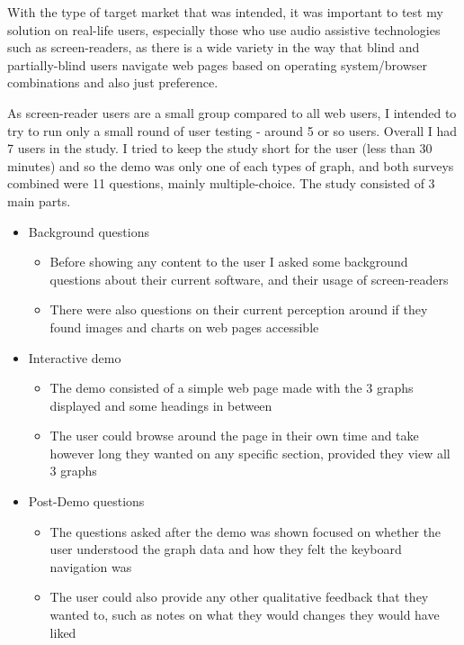 \documentclass[ %
                    author={Aleena Baig},
                supervisor={Dr Simon Lock},
                    degree={BSc},
                     title={On Making Web Accessible Graphs},
                  subtitle={},
                      year={2019} ]{dissertation}
\begin{document}


With the type of target market that was intended, it was important to test my solution on real-life users, especially those who use audio assistive technologies such as screen-readers, as there is a wide variety in the way that blind and partially-blind users navigate web pages based on operating system/browser combinations and also just preference.

As screen-reader users are a small group compared to all web users, I intended to try to run only a small round of user testing - around 5 or so users. Overall I had 7 users in the study. I tried to keep the study short for the user (less than 30 minutes) and so the demo was only one of each types of graph, and both surveys combined were 11 questions, mainly multiple-choice. The study consisted of 3 main parts. 

\begin{itemize}
    \item Background questions
    \begin{itemize}
        \item Before showing any content to the user I asked some background questions about their current software, and their usage of screen-readers
        \item There were also questions on their current perception around if they found images and charts on web pages accessible
    \end{itemize}
    \item Interactive demo
    \begin{itemize}
        \item The demo consisted of a simple web page made with the 3 graphs displayed and some headings in between
        \item The user could browse around the page in their own time and take however long they wanted on any specific section, provided they view all 3 graphs
    \end{itemize}
    \item Post-Demo questions
    \begin{itemize}
        \item The questions asked after the demo was shown focused on whether the user understood the graph data and how they felt the keyboard navigation was
        \item The user could also provide any other qualitative feedback that they wanted to, such as notes on what they would changes they would have liked
    \end{itemize}
\end{itemize}
\end{document}
